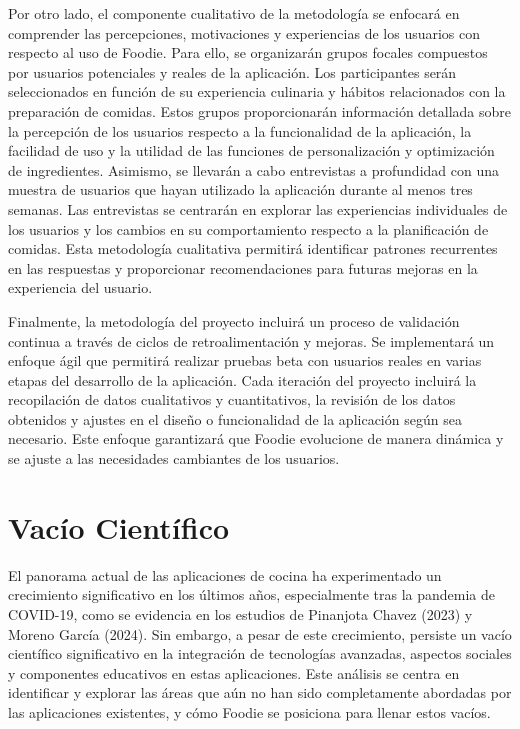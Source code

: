 \documentclass[a4paper,12pt]{article}
\begin{document}
Por otro lado, el componente cualitativo de la metodología se enfocará en comprender las percepciones, motivaciones y experiencias de los usuarios con respecto al uso de Foodie. Para ello, se organizarán grupos focales compuestos por usuarios potenciales y reales de la aplicación. Los participantes serán seleccionados en función de su experiencia culinaria y hábitos relacionados con la preparación de comidas. Estos grupos proporcionarán información detallada sobre la percepción de los usuarios respecto a la funcionalidad de la aplicación, la facilidad de uso y la utilidad de las funciones de personalización y optimización de ingredientes.
Asimismo, se llevarán a cabo entrevistas a profundidad con una muestra de usuarios que hayan utilizado la aplicación durante al menos tres semanas. Las entrevistas se centrarán en explorar las experiencias individuales de los usuarios y los cambios en su comportamiento respecto a la planificación de comidas. Esta metodología cualitativa permitirá identificar patrones recurrentes en las respuestas y proporcionar recomendaciones para futuras mejoras en la experiencia del usuario.

Finalmente, la metodología del proyecto incluirá un proceso de validación continua a través de ciclos de retroalimentación y mejoras. Se implementará un enfoque ágil que permitirá realizar pruebas beta con usuarios reales en varias etapas del desarrollo de la aplicación. Cada iteración del proyecto incluirá la recopilación de datos cualitativos y cuantitativos, la revisión de los datos obtenidos y ajustes en el diseño o funcionalidad de la aplicación según sea necesario. Este enfoque garantizará que Foodie evolucione de manera dinámica y se ajuste a las necesidades cambiantes de los usuarios.

\section*{Vacío Científico}
El panorama actual de las aplicaciones de cocina ha experimentado un crecimiento significativo en los últimos años, especialmente tras la pandemia de COVID-19, como se evidencia en los estudios de Pinanjota Chavez (2023) y Moreno García (2024). Sin embargo, a pesar de este crecimiento, persiste un vacío científico significativo en la integración de tecnologías avanzadas, aspectos sociales y componentes educativos en estas aplicaciones. Este análisis se centra en identificar y explorar las áreas que aún no han sido completamente abordadas por las aplicaciones existentes, y cómo Foodie se posiciona para llenar estos vacíos.
\end{document}
